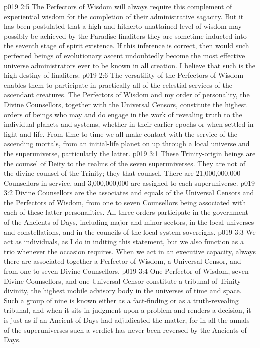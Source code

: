 \vs p019 2:5 The Perfectors of Wisdom will always require this complement of experiential wisdom for the completion of their administrative sagacity. But it has been postulated that a high and hitherto unattained level of wisdom may possibly be achieved by the Paradise finaliters  they are sometime inducted into the seventh stage of spirit existence. If this inference is correct, then would such perfected beings of evolutionary ascent undoubtedly become the most effective universe administrators ever to be known in all creation. I believe that such is the high destiny of finaliters.
\vs p019 2:6 \pc The versatility of the Perfectors of Wisdom enables them to participate in practically all of the celestial services of the ascendant creatures. The Perfectors of Wisdom and my order of personality, the Divine Counsellors, together with the Universal Censors, constitute the highest orders of beings who may and do engage in the work of revealing truth to the individual planets and systems, whether in their earlier epochs or when settled in light and life. From time to time we all make contact with the service of the ascending mortals, from an initial\hyp{}life planet on up through a local universe and the superuniverse, particularly the latter.
\vs p019 3:1 These Trinity\hyp{}origin beings are the counsel of Deity to the realms of the seven superuniverses. They are not  of the divine counsel of the Trinity; they  that counsel. There are 21,000,000,000 Counsellors in service, and 3,000,000,000 are assigned to each superuniverse.
\vs p019 3:2 Divine Counsellors are the associates and equals of the Universal Censors and the Perfectors of Wisdom, from one to seven Counsellors being associated with each of these latter personalities. All three orders participate in the government of the Ancients of Days, including major and minor sectors, in the local universes and constellations, and in the councils of the local system sovereigns.
\vs p019 3:3 We act as individuals, as I do in inditing this statement, but we also function as a trio whenever the occasion requires. When we act in an executive capacity, always there are associated together a Perfector of Wisdom, a Universal Censor, and from one to seven Divine Counsellors.
\vs p019 3:4 \pc One Perfector of Wisdom, seven Divine Counsellors, and one Universal Censor constitute a tribunal of Trinity divinity, the highest mobile advisory body in the universes of time and space. Such a group of nine is known either as a fact\hyp{}finding or as a truth\hyp{}revealing tribunal, and when it sits in judgment upon a problem and renders a decision, it is just as if an Ancient of Days had adjudicated the matter, for in all the annals of the superuniverses such a verdict has never been reversed by the Ancients of Days.
